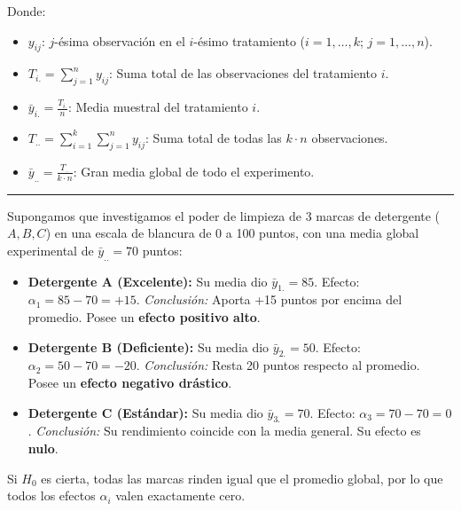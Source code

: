\documentclass[10pt,a4paper]{article}
\begin{document}
Donde:
\begin{itemize}[leftmargin=16pt,itemsep=0pt,topsep=1pt,parsep=0pt]
  \item $y_{ij}$: $j$-ésima observación en el $i$-ésimo tratamiento ($i=1,\ldots,k$; $j=1,\ldots,n$).
  \item $T_{i.} = \sum_{j=1}^{n} y_{ij}$: Suma total de las observaciones del tratamiento $i$.
  \item $\bar{y}_{i.} = \frac{T_{i.}}{n}$: Media muestral del tratamiento $i$.
  \item $T_{..} = \sum_{i=1}^{k}\sum_{j=1}^{n} y_{ij}$: Suma total de todas las $k\cdot n$ observaciones.
  \item $\bar{y}_{..} = \frac{T_{..}}{k\cdot n}$: Gran media global de todo el experimento.
\end{itemize}

\vspace{2pt}
\hrule
\vspace{4pt}

\begin{tcolorbox}[colback=blue!5, colframe=blue!45!black, title={\small\bfseries Análisis Profundo del Efecto del Tratamiento ($\alpha_i$)}, boxsep=1pt, left=4pt, right=4pt, top=2pt, bottom=2pt]
{\small
Supongamos que investigamos el poder de limpieza de 3 marcas de detergente ($A, B, C$) en una escala de blancura de 0 a 100 puntos, con una media global experimental de $\bar{y}_{..} = 70$ puntos:
\begin{itemize}[leftmargin=14pt,itemsep=1pt,topsep=1pt,parsep=0pt]
  \item \textbf{Detergente A (Excelente):} Su media dio $\bar{y}_{1.} = 85$. Efecto: $\alpha_1 = 85-70 = +15$. \textit{Conclusión:} Aporta +15 puntos por encima del promedio. Posee un \textbf{efecto positivo alto}.
  \item \textbf{Detergente B (Deficiente):} Su media dio $\bar{y}_{2.} = 50$. Efecto: $\alpha_2 = 50-70 = -20$. \textit{Conclusión:} Resta 20 puntos respecto al promedio. Posee un \textbf{efecto negativo drástico}.
  \item \textbf{Detergente C (Estándar):} Su media dio $\bar{y}_{3.} = 70$. Efecto: $\alpha_3 = 70-70 = 0$. \textit{Conclusión:} Su rendimiento coincide con la media general. Su efecto es \textbf{nulo}.
\end{itemize}
Si $H_0$ es cierta, todas las marcas rinden igual que el promedio global, por lo que todos los efectos $\alpha_i$ valen exactamente cero.
}
\end{tcolorbox}
\end{document}
